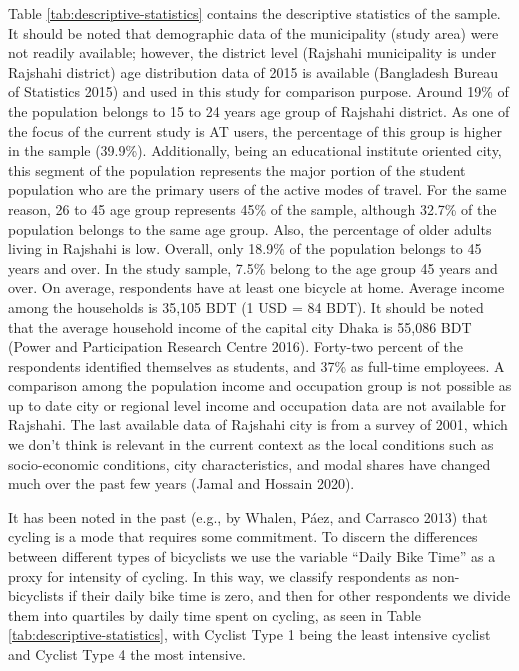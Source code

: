 \documentclass[]{elsarticle} %
\begin{document}
Table \ref{tab:descriptive-statistics} contains the descriptive
statistics of the sample. It should be noted that demographic data of
the municipality (study area) were not readily available; however, the
district level (Rajshahi municipality is under Rajshahi district) age
distribution data of 2015 is available (Bangladesh Bureau of Statistics
2015) and used in this study for comparison purpose. Around 19\% of the
population belongs to 15 to 24 years age group of Rajshahi district. As
one of the focus of the current study is AT users, the percentage of
this group is higher in the sample (39.9\%). Additionally, being an
educational institute oriented city, this segment of the population
represents the major portion of the student population who are the
primary users of the active modes of travel. For the same reason, 26 to
45 age group represents 45\% of the sample, although 32.7\% of the
population belongs to the same age group. Also, the percentage of older
adults living in Rajshahi is low. Overall, only 18.9\% of the population
belongs to 45 years and over. In the study sample, 7.5\% belong to the
age group 45 years and over. On average, respondents have at least one
bicycle at home. Average income among the households is 35,105 BDT (1
USD = 84 BDT). It should be noted that the average household income of
the capital city Dhaka is 55,086 BDT (Power and Participation Research
Centre 2016). Forty-two percent of the respondents identified themselves
as students, and 37\% as full-time employees. A comparison among the
population income and occupation group is not possible as up to date
city or regional level income and occupation data are not available for
Rajshahi. The last available data of Rajshahi city is from a survey of
2001, which we don't think is relevant in the current context as the
local conditions such as socio-economic conditions, city
characteristics, and modal shares have changed much over the past few
years (Jamal and Hossain 2020).

It has been noted in the past (e.g., by Whalen, Páez, and Carrasco 2013)
that cycling is a mode that requires some commitment. To discern the
differences between different types of bicyclists we use the variable
``Daily Bike Time'' as a proxy for intensity of cycling. In this way, we
classify respondents as non-bicyclists if their daily bike time is zero,
and then for other respondents we divide them into quartiles by daily
time spent on cycling, as seen in Table
\ref{tab:descriptive-statistics}, with Cyclist Type 1 being the least
intensive cyclist and Cyclist Type 4 the most intensive.
\end{document}
